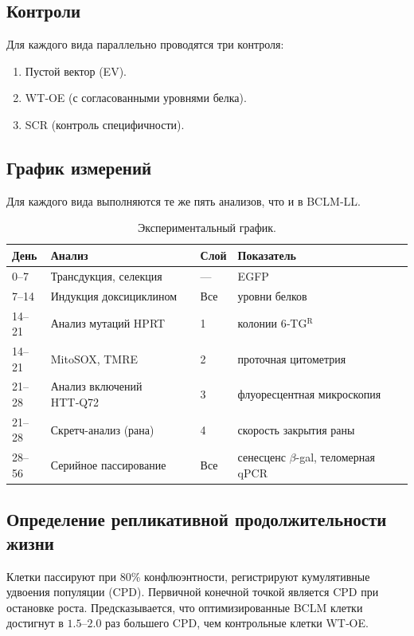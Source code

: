 \documentclass[12pt,a4paper]{article}
\begin{document}
	\subsection{Контроли}
	Для каждого вида параллельно проводятся три контроля:
	\begin{enumerate}
		\item Пустой вектор (EV).
		\item WT‑OE (с согласованными уровнями белка).
		\item SCR (контроль специфичности).
	\end{enumerate}
	
	\subsection{График измерений}
	Для каждого вида выполняются те же пять анализов, что и в BCLM‑LL.
	
	\begin{table}[H]
		\centering
		\caption{Экспериментальный график.}
		\label{tab:schedule}
		\begin{tabular}{@{}llll@{}}
			\toprule
			\textbf{День} & \textbf{Анализ} & \textbf{Слой} & \textbf{Показатель} \\
			\midrule
			0–7   & Трансдукция, селекция & --- & EGFP \\
			7–14  & Индукция доксициклином & Все & уровни белков \\
			14–21 & Анализ мутаций HPRT & 1 & колонии 6‑TG\(^{\mathrm{R}}\) \\
			14–21 & MitoSOX, TMRE & 2 & проточная цитометрия \\
			21–28 & Анализ включений HTT‑Q72 & 3 & флуоресцентная микроскопия \\
			21–28 & Скретч-анализ (рана) & 4 & скорость закрытия раны \\
			28–56 & Серийное пассирование & Все & сенесценс \(\beta\)-gal, теломерная qPCR \\
			\bottomrule
		\end{tabular}
	\end{table}
	
	\subsection{Определение репликативной продолжительности жизни}
	Клетки пассируют при 80\% конфлюэнтности, регистрируют кумулятивные удвоения популяции (CPD). Первичной конечной точкой является CPD при остановке роста. Предсказывается, что оптимизированные BCLM клетки достигнут в \(1.5\)–\(2.0\) раз большего CPD, чем контрольные клетки WT‑OE.
	
\end{document}

